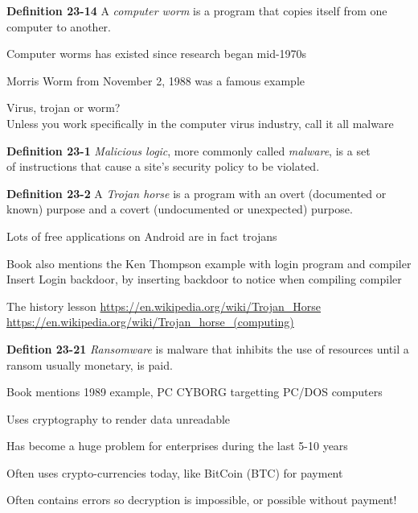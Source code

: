 \documentclass[Screen16to9,17pt]{foils}
\begin{document}

\begin{list1}
\item {\bf Definition 23-14} A \emph{computer worm} is a program that copies itself from one computer to another.
\item Computer worms has existed since research began mid-1970s
\item Morris Worm from November 2, 1988 was a famous example
\vskip 2cm
\item Virus, trojan or worm?\\
Unless you work specifically in the computer virus industry, call it all malware

\end{list1}




\begin{list1}
\item {\bf Definition 23-1} \emph{Malicious logic}, more commonly called \emph{malware}, is a set\\
 of instructions that cause a site's security policy to be violated.
\item {\bf Definition 23-2} A \emph{Trojan horse} is a program with an overt (documented or\\
known) purpose and a covert (undocumented or unexpected) purpose.

\item Lots of free applications on Android are in fact trojans

\item Book also mentions the Ken Thompson example with login program and compiler\\Insert Login backdoor, by inserting backdoor to notice when compiling compiler \smiley
\end{list1}

The history lesson
\url{https://en.wikipedia.org/wiki/Trojan_Horse}\\
\url{https://en.wikipedia.org/wiki/Trojan_horse_(computing)}



\begin{list1}
\item {\bf Defition 23-21} \emph{Ransomware} is malware that inhibits the use of resources until a ransom usually monetary, is paid.
\item Book mentions 1989 example, PC CYBORG targetting PC/DOS computers
\item Uses cryptography to render data unreadable
\item Has become a huge problem for enterprises during the last 5-10 years
\item Often uses crypto-currencies today, like BitCoin (BTC) for payment
\item Often contains errors so decryption is impossible, or possible without payment!
\end{list1}
\end{document}
